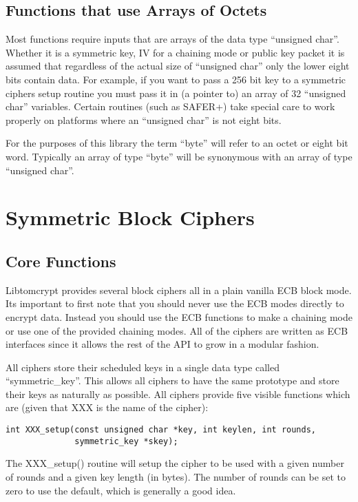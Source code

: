 \documentclass[b5paper]{book}
\begin{document}
\section{Functions that use Arrays of Octets}
Most functions require inputs that are arrays of the data type ``unsigned char''.  Whether it is a symmetric key, IV
for a chaining mode or public key packet it is assumed that regardless of the actual size of ``unsigned char'' only the
lower eight bits contain data.  For example, if you want to pass a 256 bit key to a symmetric ciphers setup routine
you must pass it in (a pointer to) an array of 32 ``unsigned char'' variables.  Certain routines 
(such as SAFER+) take special care to work properly on platforms where an ``unsigned char'' is not eight bits.

For the purposes of this library the term ``byte'' will refer to an octet or eight bit word.  Typically an array of
type ``byte'' will be synonymous with an array of type ``unsigned char''.

\chapter{Symmetric Block Ciphers}
\section{Core Functions}

Libtomcrypt provides several block ciphers all in a plain vanilla ECB block mode.  Its important to first note that you 
should never use the ECB modes directly to encrypt data.  Instead you should use the ECB functions to make a chaining mode
or use one of the provided chaining modes.  All of the ciphers are written as ECB interfaces since it allows the rest of
the API to grow in a modular fashion.

All ciphers store their scheduled keys in a single data type called ``symmetric\_key''.  This allows all ciphers to 
have the same prototype and store their keys as  naturally as possible.  All ciphers provide five visible functions which
are (given that XXX is the name of the cipher):
\begin{verbatim}
int XXX_setup(const unsigned char *key, int keylen, int rounds,
              symmetric_key *skey);
\end{verbatim}

The XXX\_setup() routine will setup the cipher to be used with a given number of rounds and a given key length (in bytes).
The number of rounds can be set to zero to use the default, which is generally a good idea.
\end{document}
